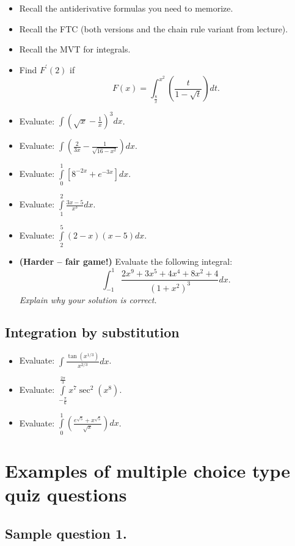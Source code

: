 \documentclass[12pt]{article}
\begin{document}
\begin{itemize}
     \item Recall the antiderivative formulas you need to memorize. 
     \item Recall the FTC (both versions and the chain rule variant from lecture). 
     \item Recall the MVT for integrals. 
     \item Find $F^{\prime}(2)$ if 
           \[
           F(x) = \int_{\frac{8}{x}}^{x^2} \left(\frac{t}{1-\sqrt{t}}\right) dt. 
      \]
     \item Evaluate: $\int\limits \left(\sqrt{x} - \frac{1}{x}\right)^3 dx$. 
     \item Evaluate: $\int\limits \left(\frac{2}{3x} - \frac{1}{\sqrt{16-x^2}}\right) dx$.  
     \item Evaluate: $\int\limits_0^1 \left[8^{-2x} + e^{-3x}\right] dx$. 
     \item Evaluate: $\int\limits_1^2 \frac{3x-5}{x^3} dx$. 
     \item Evaluate: $\int\limits_2^5 (2-x)(x-5) dx$. 
     \item \textbf{(Harder -- fair game!)} 
           Evaluate the following integral: 
           \[
                \int_{-1}^{1} \frac{2x^9 + 3x^5 + 4x^4 + 8x^2 + 4}{(1+x^2)^3} dx. 
           \]
           \emph{Explain why your solution is correct.} 
\end{itemize}

\subsection{Integration by substitution}

\begin{itemize}
     \item Evaluate: $\int\limits \frac{\tan\left(x^{1/3}\right)}{x^{2/3}} dx$. 
     \item Evaluate: $\int\limits_{-\frac{\pi}{6}}^{\frac{2\pi}{3}} x^7 \sec^2\left(x^8\right)$. 
     \item Evaluate: $\int\limits_0^1\left(\frac{e^{\sqrt{5}} + x^{\sqrt{5}}}{\sqrt{x}}\right) dx$. 
\end{itemize}

\newpage
\section{Examples of multiple choice type quiz questions}

\subsection*{Sample question 1.}
\end{document}
